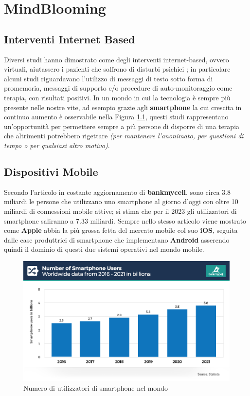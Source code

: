 \chapter{MindBlooming}
\section{Interventi Internet Based}

Diversi studi hanno dimostrato come degli interventi internet-based, ovvero virtuali, aiutassero i pazienti che soffrono di disturbi psichici \cite{taylor2003computer}; in particolare alcuni studi riguardavano l'utilizzo di messaggi di testo sotto forma di promemoria, messaggi di supporto e/o procedure di auto-monitoraggio come terapia, con risultati positivi.
In un mondo in cui la tecnologia è sempre più presente nelle nostre vite, ad esempio grazie agli \textbf{smartphone} la cui crescita in continuo aumento è osservabile nella Figura \ref{fig:smartphone_users}, questi studi rappresentano un'opportunità per permettere sempre a più persone di disporre di una terapia che altrimenti potrebbero rigettare \textit{(per mantenere l'anonimato, per questioni di tempo o per qualsiasi altro motivo)}.

\section{Dispositivi Mobile}
Secondo l'articolo in costante aggiornamento di \textbf{bankmycell}\cite{bankmycell}, sono circa 3.8 miliardi le persone che utilizzano uno smartphone al giorno d'oggi con oltre 10 miliardi di connessioni mobile attive; si stima che per il 2023 gli utilizzatori di smartphone saliranno a 7.33 miliardi. Sempre nello stesso articolo viene mostrato come \textbf{Apple} abbia la più grossa fetta del mercato mobile col suo \textbf{iOS}, seguita dalle case produttrici di smartphone che implementano \textbf{Android} asserendo quindi il dominio di questi due sistemi operativi nel mondo mobile.

\begin{figure}
\centering
\includegraphics[width=\textwidth]{img/smartphone_users}
\caption{Numero di utilizzatori di smartphone nel mondo \cite{bankmycell}}
\label{fig:smartphone_users}
\end{figure}

